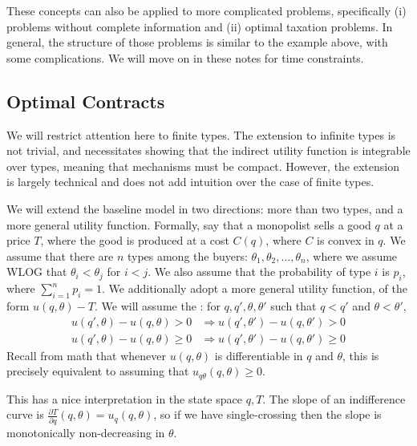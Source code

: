 \documentclass[10pt]{article}
\begin{document}
\begin{remark}
	These concepts can also be applied to more complicated problems, specifically (i) problems without complete information and (ii) optimal taxation problems. In general, the structure of those problems is similar to the example above, with some complications. We will move on in these notes for time constraints.
\end{remark}

\subsection{Optimal Contracts}

\begin{remark}
	We will restrict attention here to finite types. The extension to infinite types is not trivial, and necessitates showing that the indirect utility function is integrable over types, meaning that mechanisms must be compact. However, the extension is largely technical and does not add intuition over the case of finite types. 
\end{remark}

\begin{model}
	 We will extend the baseline model in two directions: more than two types, and a more general utility function. Formally, say that a monopolist sells a good $q$ at a price $T$, where the good is produced at a cost $C(q)$, where $C$ is convex in $q$. We assume that there are $n$ types among the buyers: $\theta_1,\theta_2,\dots,\theta_n$, where we assume WLOG that $\theta_i < \theta_j$ for $i < j$. We also assume that the probability of type $i$ is $p_i$, where $\sum_{i=1}^n p_i = 1$. We additionally adopt a more general utility function, of the form $u(q,\theta)-T$. We will assume the : for $q,q',\theta,\theta'$ such that $q < q'$ and $\theta < \theta'$, \begin{align*} u(q',\theta) - u(q,\theta) > 0 &\Longrightarrow u(q',\theta') - u(q,\theta') > 0 \\u(q',\theta) - u(q,\theta) \ge 0 &\Longrightarrow u(q',\theta') - u(q,\theta') \ge 0\end{align*}Recall from math that whenever $u(q,\theta)$ is differentiable in $q$ and $\theta$, this is precisely equivalent to assuming that $u_{q\theta}(q,\theta) \ge 0$. 
\end{model}

\begin{remark}
	This has a nice interpretation in the state space $q,T$. The slope of an indifference curve is $\frac{\partial T}{\partial q} (q,\theta) = u_q(q,\theta)$, so if we have single-crossing then the slope is monotonically non-decreasing in $\theta$. 
\end{remark}
\end{document}
